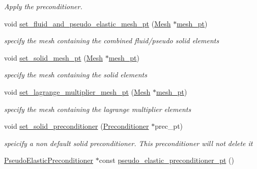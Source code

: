 \begin{DoxyCompactItemize}
\begin{DoxyCompactList}\small\item\em Apply the preconditioner. \end{DoxyCompactList}\item 
void \hyperlink{classoomph_1_1PseudoElasticFSIPreconditioner_a8d0b7212ad06c4f5942fed253c680010}{set\+\_\+fluid\+\_\+and\+\_\+pseudo\+\_\+elastic\+\_\+mesh\+\_\+pt} (\hyperlink{classoomph_1_1Mesh}{Mesh} $\ast$\hyperlink{classoomph_1_1BlockPreconditioner_a3c0e92cb77c3e3179007fe9fd99b6428}{mesh\+\_\+pt})
\begin{DoxyCompactList}\small\item\em specify the mesh containing the combined fluid/pseudo solid elements \end{DoxyCompactList}\item 
void \hyperlink{classoomph_1_1PseudoElasticFSIPreconditioner_af2c1fc8d2dd795c5a4a2ae266ad32d18}{set\+\_\+solid\+\_\+mesh\+\_\+pt} (\hyperlink{classoomph_1_1Mesh}{Mesh} $\ast$\hyperlink{classoomph_1_1BlockPreconditioner_a3c0e92cb77c3e3179007fe9fd99b6428}{mesh\+\_\+pt})
\begin{DoxyCompactList}\small\item\em specify the mesh containing the solid elements \end{DoxyCompactList}\item 
void \hyperlink{classoomph_1_1PseudoElasticFSIPreconditioner_ad30185179d7c2bc6c725e550c48a0c90}{set\+\_\+lagrange\+\_\+multiplier\+\_\+mesh\+\_\+pt} (\hyperlink{classoomph_1_1Mesh}{Mesh} $\ast$\hyperlink{classoomph_1_1BlockPreconditioner_a3c0e92cb77c3e3179007fe9fd99b6428}{mesh\+\_\+pt})
\begin{DoxyCompactList}\small\item\em specify the mesh containing the lagrange multiplier elements \end{DoxyCompactList}\item 
void \hyperlink{classoomph_1_1PseudoElasticFSIPreconditioner_a92e59f83606d77e7407a4ace534546f2}{set\+\_\+solid\+\_\+preconditioner} (\hyperlink{classoomph_1_1Preconditioner}{Preconditioner} $\ast$prec\+\_\+pt)
\begin{DoxyCompactList}\small\item\em speicify a non default solid preconditioner. This preconditioner will not delete it \end{DoxyCompactList}\item 
\hyperlink{classoomph_1_1PseudoElasticPreconditioner}{Pseudo\+Elastic\+Preconditioner} $\ast$const \hyperlink{classoomph_1_1PseudoElasticFSIPreconditioner_af10b20ad8e90cd99ba35326f1207d6a7}{pseudo\+\_\+elastic\+\_\+preconditioner\+\_\+pt} ()

\end{DoxyCompactItemize}
